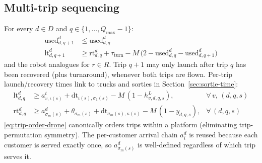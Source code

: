 \documentclass[10pt]{article}
\begin{document}
\subsection{Multi-trip sequencing}
\label{sec:multitrip}
For every $d\in D$ and $q \in \{1,\dots,Q_{\max}-1\}$:
\begin{align}
\mathrm{used}^d_{d,q+1} &\le \mathrm{used}^d_{d,q} \label{eq:trip-order-drone}\\
\mathrm{lt}^d_{d,q+1} &\ge \mathrm{rt}^d_{d,q} + \tau_{\mathrm{turn}}
  - M\,\big(2 - \mathrm{used}^d_{d,q} - \mathrm{used}^d_{d,q+1}\big) \label{eq:trip-seq-drone}
\end{align}
and the robot analogues for $r\in R$. Trip $q+1$ may only launch after trip
$q$ has been recovered (plus turnaround), whenever both trips are flown.
Per-trip launch/recovery times link to trucks and sorties in
Section~\ref{sec:sortie-time}:
\begin{align}
\mathrm{lt}^d_{d,q} &\ge a^t_{v,\iota(s)} + \mathrm{dt}_{\iota(s),\sigma_1(s)}
  - M\,(1-h^L_{v,d,q,s}), & \forall\,v,\,(d,q,s) \label{eq:trip-launch-time}\\
\mathrm{rt}^d_{d,q} &\ge a^d_{\sigma_m(s)} + \theta_{\sigma_m(s)}
  + \mathrm{dt}_{\sigma_m(s),\kappa(s)} - M\,(1-y_{d,q,s}), & \forall\,(d,q,s) \label{eq:trip-recover-time}
\end{align}
\noindent \eqref{eq:trip-order-drone} canonically orders trips within a
platform (eliminating trip-permutation symmetry). The per-customer arrival
chain $a^d_i$ is reused because each customer is served exactly once, so
$a^d_{\sigma_m(s)}$ is well-defined regardless of which trip serves it.
\end{document}
